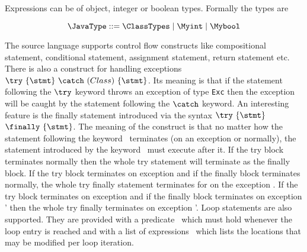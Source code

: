     Expressions can be of object, integer or boolean types. Formally the types are 

$$ \JavaType ::= \ClassTypes \mid \Myint \mid \Mybool $$ 





  The source language supports control flow constructs like 
  compositional statement, conditional statement, assignment statement, return statement etc.
  There is also a construct for handling exceptions $ \try  \ \{ \stmt \}  \ \catch \ ( Class  )\ \{ \stmt \}  $.
  Its meaning is that if the statement following the $ \try $ keyword throws an exception of type \texttt{Exc} then
  the exception will be caught by the statement following the  $ \catch $ keyword. An interesting feature  is the finally statement
  introduced via the syntax $ \try  \ \{ \stmt \}  $ $ \finally \ \{ \stmt \}$.  The meaning of the construct is that  
  no matter how the statement following the keyword \try \ terminates (on an exception or normally),
  the statement introduced by the keyword \finally \ must execute after it. If the try block terminates normally then the
  whole try statement will terminate as the finally block. If the try block terminates on exception \Exc{} and if the finally block
  terminates normally, the whole try finally statement terminates for on the exception  \Exc{}.  If the try block terminates on exception \Exc{} and if the finally block
  terminates on exception \Exc' then the whole try finally  terminates on exception \Exc'.
  Loop statements are also supported.  They are provided with a predicate \invariant \ which must hold whenever 
  the loop entry is reached and with a list of expressions
   \modLoop \ which lists the locations that  may be modified per loop iteration.

